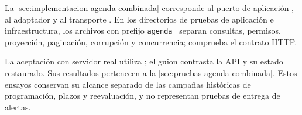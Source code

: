 {\raggedright La \cref{sec:implementacion-agenda-combinada} corresponde al puerto de aplicación , al adaptador  y al transporte . En los directorios de pruebas de aplicación e infraestructura, los archivos con prefijo \texttt{agenda\_} separan consultas, permisos, proyección, paginación, corrupción y concurrencia;  comprueba el contrato HTTP.\par}

La aceptación con servidor real utiliza ; el guion  contrasta la API y su estado restaurado. Sus resultados pertenecen a la \cref{sec:pruebas-agenda-combinada}. Estos ensayos conservan su alcance separado de las campañas históricas de programación, plazos y reevaluación, y no representan pruebas de entrega de alertas.
